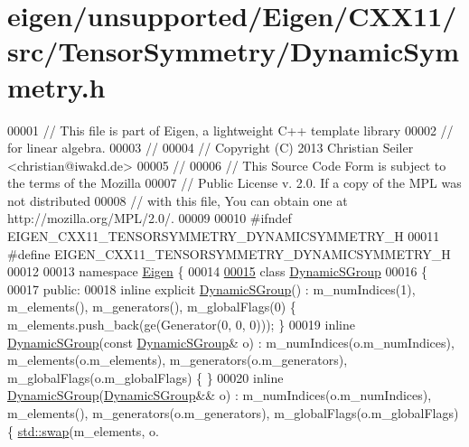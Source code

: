 \hypertarget{eigen_2unsupported_2_eigen_2_c_x_x11_2src_2_tensor_symmetry_2_dynamic_symmetry_8h_source}{}\section{eigen/unsupported/\+Eigen/\+C\+X\+X11/src/\+Tensor\+Symmetry/\+Dynamic\+Symmetry.h}
\label{eigen_2unsupported_2_eigen_2_c_x_x11_2src_2_tensor_symmetry_2_dynamic_symmetry_8h_source}

\begin{DoxyCode}
00001 \textcolor{comment}{// This file is part of Eigen, a lightweight C++ template library}
00002 \textcolor{comment}{// for linear algebra.}
00003 \textcolor{comment}{//}
00004 \textcolor{comment}{// Copyright (C) 2013 Christian Seiler <christian@iwakd.de>}
00005 \textcolor{comment}{//}
00006 \textcolor{comment}{// This Source Code Form is subject to the terms of the Mozilla}
00007 \textcolor{comment}{// Public License v. 2.0. If a copy of the MPL was not distributed}
00008 \textcolor{comment}{// with this file, You can obtain one at http://mozilla.org/MPL/2.0/.}
00009 
00010 \textcolor{preprocessor}{#ifndef EIGEN\_CXX11\_TENSORSYMMETRY\_DYNAMICSYMMETRY\_H}
00011 \textcolor{preprocessor}{#define EIGEN\_CXX11\_TENSORSYMMETRY\_DYNAMICSYMMETRY\_H}
00012 
00013 \textcolor{keyword}{namespace }\hyperlink{namespace_eigen}{Eigen} \{
00014 
\hyperlink{class_eigen_1_1_dynamic_s_group}{00015} \textcolor{keyword}{class }\hyperlink{class_eigen_1_1_dynamic_s_group}{DynamicSGroup}
00016 \{
00017   \textcolor{keyword}{public}:
00018     \textcolor{keyword}{inline} \textcolor{keyword}{explicit} \hyperlink{class_eigen_1_1_dynamic_s_group}{DynamicSGroup}() : m\_numIndices(1), m\_elements(), m\_generators(), 
      m\_globalFlags(0) \{ m\_elements.push\_back(ge(Generator(0, 0, 0))); \}
00019     \textcolor{keyword}{inline} \hyperlink{class_eigen_1_1_dynamic_s_group}{DynamicSGroup}(\textcolor{keyword}{const} \hyperlink{class_eigen_1_1_dynamic_s_group}{DynamicSGroup}& o) : m\_numIndices(o.m\_numIndices), 
      m\_elements(o.m\_elements), m\_generators(o.m\_generators), m\_globalFlags(o.m\_globalFlags) \{ \}
00020     \textcolor{keyword}{inline} \hyperlink{class_eigen_1_1_dynamic_s_group}{DynamicSGroup}(\hyperlink{class_eigen_1_1_dynamic_s_group}{DynamicSGroup}&& o) : m\_numIndices(o.m\_numIndices), 
      m\_elements(), m\_generators(o.m\_generators), m\_globalFlags(o.m\_globalFlags) \{ \hyperlink{endian_8c_a3ca5ecd34b04d6a243c054ac3a57f68d}{std::swap}(m\_elements, o.

\end{DoxyCode}
